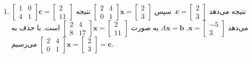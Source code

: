 \documentclass[12pt,a4paper]{article}
\begin{document}
{\begin{enumerate}
			\item $\begin{bmatrix} 1 & 0 \\ 4 & 1 \end{bmatrix} \boldsymbol{c} = \begin{bmatrix} 2 \\ 11 \end{bmatrix}$ نتیجه می‌دهد $\boldsymbol{c} = \begin{bmatrix} 2 \\ 3 \end{bmatrix}$. سپس $\begin{bmatrix} 2 & 4 \\ 0 & 1 \end{bmatrix} \boldsymbol{x} = \begin{bmatrix} 2 \\ 3 \end{bmatrix}$ نتیجه می‌دهد $\boldsymbol{x} = \begin{bmatrix} -5 \\ 3 \end{bmatrix}$.
			$A\boldsymbol{x}=\boldsymbol{b}$ به صورت $\begin{bmatrix} 2 & 4 \\ 8 & 17 \end{bmatrix} \boldsymbol{x} = \begin{bmatrix} 2 \\ 11 \end{bmatrix}$ است. با حذف به $\begin{bmatrix} 2 & 4 \\ 0 & 1 \end{bmatrix} \boldsymbol{x} = \begin{bmatrix} 2 \\ 3 \end{bmatrix} = \boldsymbol{c}$ می‌رسیم.
			

\end{enumerate}}
\end{document}
